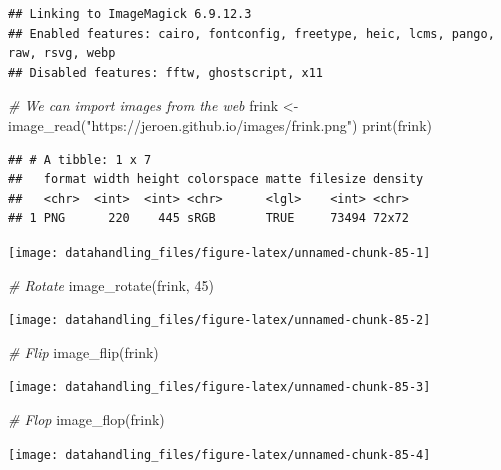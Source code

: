 \documentclass[
  12pt,
]{style/krantz}
\newenvironment{Shaded}{\begin{snugshade}}{\end{snugshade}}
\newcommand{\CommentTok}[1]{\textcolor[rgb]{0.56,0.35,0.01}{\textit{#1}}}
\newcommand{\DecValTok}[1]{\textcolor[rgb]{0.00,0.00,0.81}{#1}}
\newcommand{\FunctionTok}[1]{\textcolor[rgb]{0.00,0.00,0.00}{#1}}
\newcommand{\NormalTok}[1]{#1}
\newcommand{\OtherTok}[1]{\textcolor[rgb]{0.56,0.35,0.01}{#1}}
\newcommand{\StringTok}[1]{\textcolor[rgb]{0.31,0.60,0.02}{#1}}
\begin{document}
\begin{verbatim}
## Linking to ImageMagick 6.9.12.3
## Enabled features: cairo, fontconfig, freetype, heic, lcms, pango, raw, rsvg, webp
## Disabled features: fftw, ghostscript, x11
\end{verbatim}

\begin{Shaded}
\begin{Highlighting}[]
\CommentTok{\# We can import images from the web}
\NormalTok{frink }\OtherTok{\textless{}{-}} \FunctionTok{image\_read}\NormalTok{(}\StringTok{"https://jeroen.github.io/images/frink.png"}\NormalTok{)}
\FunctionTok{print}\NormalTok{(frink)}
\end{Highlighting}
\end{Shaded}

\begin{verbatim}
## # A tibble: 1 x 7
##   format width height colorspace matte filesize density
##   <chr>  <int>  <int> <chr>      <lgl>    <int> <chr>  
## 1 PNG      220    445 sRGB       TRUE     73494 72x72
\end{verbatim}

\texttt{[image: datahandling\_files/figure-latex/unnamed-chunk-85-1]}

\begin{Shaded}
\begin{Highlighting}[]
\CommentTok{\# Rotate}
\FunctionTok{image\_rotate}\NormalTok{(frink, }\DecValTok{45}\NormalTok{)}
\end{Highlighting}
\end{Shaded}

\texttt{[image: datahandling\_files/figure-latex/unnamed-chunk-85-2]}

\begin{Shaded}
\begin{Highlighting}[]
\CommentTok{\# Flip}
\FunctionTok{image\_flip}\NormalTok{(frink)}
\end{Highlighting}
\end{Shaded}

\texttt{[image: datahandling\_files/figure-latex/unnamed-chunk-85-3]}

\begin{Shaded}
\begin{Highlighting}[]
\CommentTok{\# Flop}
\FunctionTok{image\_flop}\NormalTok{(frink)}
\end{Highlighting}
\end{Shaded}

\texttt{[image: datahandling\_files/figure-latex/unnamed-chunk-85-4]}
\end{document}
